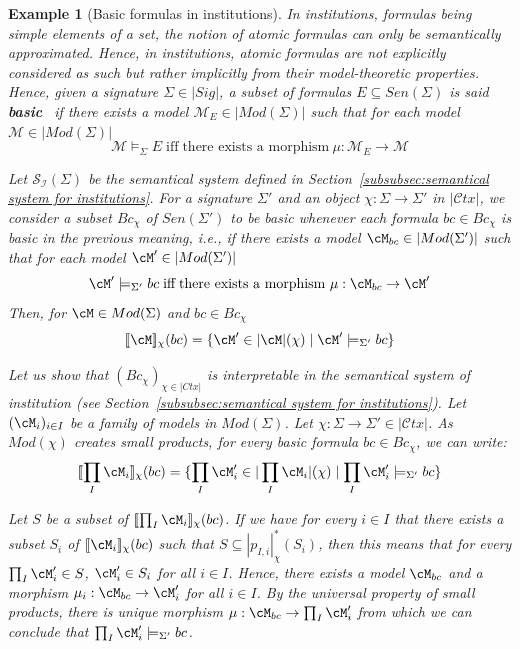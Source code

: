 \documentclass[preprint,3p,times]{elsarticle}
\newtheorem{example}[definition]{Example}
\def\sem#1{[\![ #1 ] \!]}
\newcommand{\Ctx}{\mathcal{C}tx}
\begin{document}
\begin{example}[Basic formulas in institutions]
\label{ex:basic formulas in Institutions}
In institutions, formulas being simple elements of a set, the notion of atomic formulas can only be semantically approximated. Hence, in institutions, atomic formulas are not explicitly considered as such but rather implicitly from their model-theoretic properties. Hence, given a signature $\Sigma \in |Sig|$, a subset of formulas $E \subseteq Sen(\Sigma)$ is said {\bf basic}~\cite[Chap. 5, p. 108]{Dia08} if there exists a model $\mathcal{M}_E \in |Mod(\Sigma)|$ such that for each model $\mathcal{M} \in |Mod(\Sigma)|$
\[
\mathcal{M} \models_\Sigma E \; \mbox{iff} \; \mbox{there exists a morphism}~ \mu : \mathcal{M}_E \to \mathcal{M}
\]

Let $\mathcal{S}_\mathcal{I}(\Sigma)$ be the semantical system defined in Section~\ref{subsubsec:semantical system for institutions}.
For a signature \(\Sigma'\) and an object \(\chi : \Sigma \to \Sigma'\) in \(|\Ctx|\), we consider a subset $Bc_\chi$ of $Sen(\Sigma')$ to be basic whenever each formula $bc \in Bc_\chi$ is basic in the previous meaning, i.e., if there exists a model $\cM_{bc} \in |Mod(\Sigma')|$ such that for each model $\cM' \in |Mod(\Sigma')|$
\[
\cM' \models_{\Sigma'} bc \; \mbox{iff} \; \mbox{there exists a morphism}~ \mu : \cM_{bc} \to \cM'
\]
Then, for $\cM \in Mod(\Sigma)$ and $bc \in Bc_\chi$
\[
    \sem{\cM}_\chi(bc) = \{\cM' \in |\cM|(\chi) \mid \cM' \models_{\Sigma'} bc\}
\]

Let us show that \((Bc_{\chi})_{\chi \in |Ctx|}\) is interpretable in the semantical system of institution (see Section~\ref{subsubsec:semantical system for institutions}).
Let $(\cM_i)_{i \in I}$ be a family of models in $Mod(\Sigma)$. Let $\chi : \Sigma \to \Sigma' \in |\Ctx|$. As $Mod(\chi)$ creates small products, for every basic formula $bc \in Bc_\chi$, we can write:
\[
    \sem{\prod_I \cM_i}_\chi(bc)  = \{\prod_I \cM'_i \in |\prod_I \cM_i|(\chi) \mid \prod_I \cM'_i \models_{\Sigma'} bc\}
\]

Let $S$ be a subset of $\sem{\prod_I \cM_i}_\chi(bc)$. 
If we have for every $i \in I$ that there exists a subset $S_i$ of $\sem{\cM_i}_\chi(bc)$ such that $S \subseteq |p_{I,i}|^*_\chi(S_i)$, then this means that for every $\prod_I \cM'_i \in S$, $\cM'_i \in S_i$ for all $i \in I$. Hence, there exists a model $\cM_{bc}$ and a morphism $\mu_i : \cM_{bc} \to \cM'_i$ for all $i \in I$. By the universal property of small products, there is unique morphism $\mu : \cM_{bc} \to \prod_I \cM'_i$ from which we can conclude that $\prod_I \cM'_i \models_{\Sigma'} bc$.
\end{example}
\end{document}
